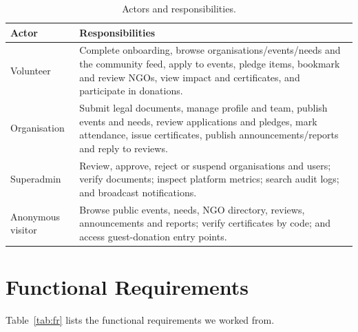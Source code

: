 \begin{table}[H]\centering
\caption{Actors and responsibilities.}
\label{tab:actors}
\begin{tabularx}{\textwidth}{|p{}|X|}
\hline
\textbf{Actor} & \textbf{Responsibilities}\\ \hline
Volunteer & Complete onboarding, browse organisations/events/needs and the community feed, apply to events, pledge items, bookmark and review NGOs, view impact and certificates, and participate in donations.\\ \hline
Organisation & Submit legal documents, manage profile and team, publish events and needs, review applications and pledges, mark attendance, issue certificates, publish announcements/reports and reply to reviews.\\ \hline
Superadmin & Review, approve, reject or suspend organisations and users; verify documents; inspect platform metrics; search audit logs; and broadcast notifications.\\ \hline
Anonymous visitor & Browse public events, needs, NGO directory, reviews, announcements and reports; verify certificates by code; and access guest-donation entry points.\\ \hline
\end{tabularx}
\end{table}

\section{Functional Requirements}
Table~\ref{tab:fr} lists the functional requirements we worked from.

